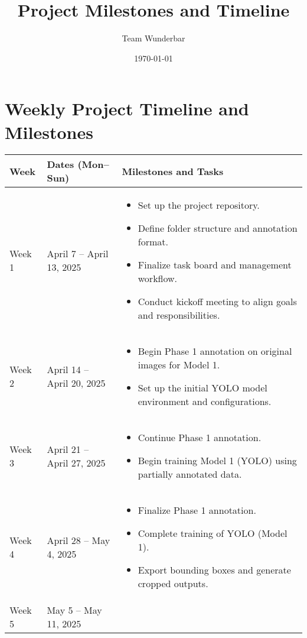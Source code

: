 \documentclass{article}
\title{Project Milestones and Timeline}
\author{Team Wunderbar}
\date{\today}
\begin{document}
\maketitle

\section*{Weekly Project Timeline and Milestones}

\begin{longtable}{|p{2.5cm}|p{4.2cm}|p{8.5cm}|}
\hline
\textbf{Week} & \textbf{Dates (Mon–Sun)} & \textbf{Milestones and Tasks} \\
\hline
Week 1 & April 7 -- April 13, 2025 &
\begin{itemize}
    \item Set up the project repository.
    \item Define folder structure and annotation format.
    \item Finalize task board and management workflow.
    \item Conduct kickoff meeting to align goals and responsibilities.
\end{itemize} \\
\hline
Week 2 & April 14 -- April 20, 2025 &
\begin{itemize}
    \item Begin Phase 1 annotation on original images for Model 1.
    \item Set up the initial YOLO model environment and configurations.
\end{itemize} \\
\hline
Week 3 & April 21 -- April 27, 2025 &
\begin{itemize}
    \item Continue Phase 1 annotation.
    \item Begin training Model 1 (YOLO) using partially annotated data.
\end{itemize} \\
\hline
Week 4 & April 28 -- May 4, 2025 &
\begin{itemize}
    \item Finalize Phase 1 annotation.
    \item Complete training of YOLO (Model 1).
    \item Export bounding boxes and generate cropped outputs.
\end{itemize} \\
\hline
Week 5 & May 5 -- May 11, 2025 &
\begin{itemize}

\end{itemize}
\end{longtable}
\end{document}
